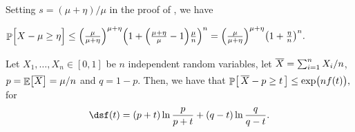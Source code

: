 \begin{remark}
    Setting $s = (\mu + \eta)/\mu$ in the proof of
    , we have

    \medskip%
    \centerline{%
    \begin{math}
        \Prob{\Bigl.X - \mu \geq \eta }%
        \leq %
        \pth{\frac{\mu}{\mu + \eta}}^{\mu + \eta}%
        \pth{1 + \pth{\frac{\mu + \eta}{\mu}-1} \frac{\mu}{n}}^n%
        = %
        \pth{\frac{\mu}{\mu + \eta}}^{\mu + \eta} \pth{1 +
           \frac{\eta}{n}}^n.%
    \end{math}%
 }
\end{remark}


\begin{corollary}
    Let $X_1, \ldots, X_n \in [0,1]$ be $n$ independent random
    variables, let $\Bigl.\overline{X} = \sum_{i=1}^n X_i/n$,
    $p = \mathop{\mathbb{E}}\!\left[ {\overline{X}} \right] = \mu/n$ and $q = 1-p$. Then, we have that
    \begin{math}
        \ds%
        \Prob{\bigl.\, \overline{X} - p \geq t \, }%
        \leq%
        \exp\pth{ \bigl. nf(t)},
    \end{math}
    for
    \begin{align}
        \eqlab{f:t:cher}%
        \ds%
        f(t) = (p+t)\ln \frac{p}{p+t} + (q-t)\ln \frac{q}{q-t}.
    \end{align}%
\end{corollary}

